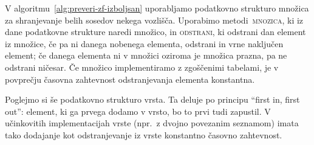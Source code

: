\documentclass[12pt,a4paper,twoside]{article}
\theoremstyle{definition} %
\theoremstyle{plain} %
\numberwithin{equation}{section}  %
\begin{document}
V algoritmu~\ref{alg:preveri-zf-izboljsan} uporabljamo podatkovno strukturo množica za shranjevanje belih sosedov nekega vozlišča. Uporabimo metodi~\textsc{mnozica}, ki iz dane podatkovne strukture naredi množico, in \textsc{odstrani}, ki odstrani dan element iz množice, če pa ni danega nobenega elementa, odstrani in vrne naključen element; če danega elementa ni v množici oziroma je množica prazna, pa ne odstrani ničesar. Če množico implementiramo z zgoščenimi tabelami, je v povprečju časovna zahtevnost odstran\-jevanja elementa konstantna.

Poglejmo si še podatkovno strukturo vrsta. Ta deluje po principu ``first in, first out'': element, ki ga prvega dodamo v vrsto, bo to prvi tudi zapustil. V učinkovitih implementacijah vrste (npr.~z dvojno povezanim seznamom) imata tako dodajanje kot odstranjevanje iz vrste konstantno časovno zahtevnost.
\end{document}
